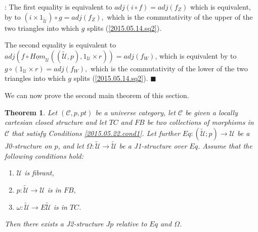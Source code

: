 \documentclass[12pt]{article}
\numberwithin{equation}{section}
\newenvironment{myproof}{{\bf Proof}:}{$\blacksquare$ \vskip 5mm }
\newtheorem{theorem}[proposition]{Theorem}
\newcommand{\sr}{\rightarrow}
\newcommand{\uu}{\underline}
\newcommand{\iHom}{\uu{Hom}}
\newcommand{\wt}{\widetilde}
\newcommand{\C}{{\mathcal C}}  %
\newcommand{\id}{1}            %
\newcommand{\U}{\mathcal{U}}
\begin{document}
\begin{myproof}
The first equality is equivalent to $adj(i\circ f)=adj(f_Z)$ which is
equivalent, by \cite[Lemma 8.7(3)]{fromunivwithPi} to
$(i\times \id_{\wt{\U}})\circ g=adj(f_Z),$
which is the commutativity of the upper of the
two triangles into which $g$ splits (\ref{2015.05.14.sq2}).

The second equality is equivalent to
$adj(f\circ \iHom_\U((\wt{\U},p), \id_\U\times r))=adj(f_W)$,
which is equivalent by \cite[Lemma 8.7(1)]{fromunivwithPi} to
$g\circ (\id_\U\times r)=adj(f_W),$ which is the
commutativity of the lower of the two triangles into which $g$ splits
(\ref{2015.05.14.sq2}).
\end{myproof}
%

We can now prove the second main theorem of this section.
%
\begin{theorem}
\label{2015.05.16.th1} Let $({\C},p,pt)$ be a universe category, let
$\C$ be given a locally cartesian closed structure and let $TC$ and
$FB$ be two collections of morphisms in $\C$ that satisfy Conditions
\ref{2015.05.22.cond1}. Let further $Eq:(\wt{\U};p)\sr \U$ be a J0-structure on $p$,
and let $\Omega:\wt{\U}\sr \wt{\U}$ be a J1-structure over $Eq$.
Assume that the following conditions hold:
%
\begin{enumerate}
\item $\U$ is fibrant,
\item $p:\wt{\U}\sr \U$ is in $FB$,
\item $\omega : \wt{\U}\sr E\wt{\U}$ is in $TC$.
\end{enumerate}
%
Then there exists a J2-structure $Jp$ relative to $Eq$ and $\Omega$.
\end{theorem}
%
\end{document}
